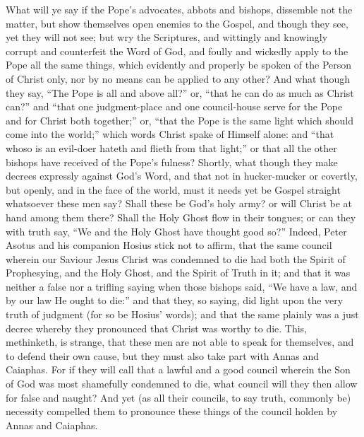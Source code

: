What will ye say if the Pope’s advocates, abbots and bishops,
dissemble not the matter, but show themselves open enemies to the Gospel,
and though they see, yet they will not see; but wry the Scriptures,
and wittingly and knowingly corrupt and counterfeit the Word of God,
and foully and wickedly apply to the Pope all the same things, which
evidently and properly be spoken of the Person of Christ only, nor by
no means can be applied to any other? And what though they say,
“The Pope is all and above all?” or, “that he can
do as much as Christ can?” and “that one judgment-place
and one council-house serve for the Pope and for Christ both together;”
or, “that the Pope is the same light which should come into the
world;” which words Christ spake of Himself alone: and “that
whoso is an evil-doer hateth and flieth
from that light;” or that all the other bishops have received
of the Pope’s fulness? Shortly, what though they make decrees
expressly against God’s Word, and that not in hucker-mucker or
covertly, but openly, and in the face of the world, must it needs yet
be Gospel straight whatsoever these men say? Shall these be God’s
holy army? or will Christ be at hand among them there? Shall the
Holy Ghost flow in their tongues; or can they with truth say, “We
and the Holy Ghost have thought good so?” Indeed, Peter
Asotus and his companion Hosius stick not to affirm, that the same council
wherein our Saviour Jesus Christ was condemned to die had both the Spirit
of Prophesying, and the Holy Ghost, and the Spirit of Truth in it; and
that it was neither a false nor a trifling saying when those bishops
said, “We have a law, and by our law He ought to die:” and
that they, so saying, did light upon the very truth of judgment (for
so be Hosius’ words); and that the same plainly was a just decree
whereby they pronounced that Christ was worthy to die. This, methinketh,
is strange, that these men are not able to speak for themselves, and
to defend their own cause, but they must also take part with Annas and
Caiaphas. For if they will call that a lawful and a good council
wherein
the Son of God was most shamefully condemned to die, what council will
they then allow for false and naught? And yet (as all their councils,
to say truth, commonly be) necessity compelled them to pronounce these
things of the council holden by Annas and Caiaphas.

